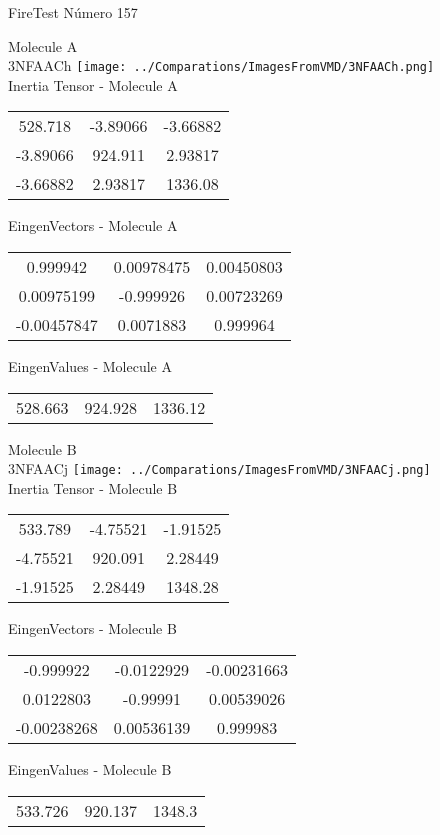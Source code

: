 \vtab[-2cm]
\begin{center}
{\large FireTest \tab Número 157}
\end{center}
\begin{multicols}{2}
\begin{center}

Molecule A \\ 
3NFAACh
\texttt{[image: ../Comparations/ImagesFromVMD/3NFAACh.png]}
\\
Inertia Tensor - Molecule A \\
\vtab

\begin{tabular}{|c c c|}
528.718	 & 	-3.89066	 & 	-3.66882	 \\
-3.89066	 & 	924.911	 & 	2.93817	 \\
-3.66882	 & 	2.93817	 & 	1336.08
\end{tabular}

\vtab
 EingenVectors - Molecule A     \\
\vtab
\begin{tabular}{|c c c|}
0.999942	 & 	0.00978475	 & 	0.00450803	 \\
0.00975199	 & 	-0.999926	 & 	0.00723269	 \\
-0.00457847	 & 	0.0071883	 & 	0.999964
\end{tabular}

\vtab
 EingenValues - Molecule A     \\
\vtab
\begin{tabular}{|c c c|}
528.663	 & 	924.928	 & 	1336.12	 \\
\end{tabular}
\columnbreak

Molecule B \\ 
3NFAACj
\texttt{[image: ../Comparations/ImagesFromVMD/3NFAACj.png]}
\\
Inertia Tensor - Molecule B \\
\vtab

\begin{tabular}{|c c c|}
533.789	 & 	-4.75521	 & 	-1.91525	 \\
-4.75521	 & 	920.091	 & 	2.28449	 \\
-1.91525	 & 	2.28449	 & 	1348.28
\end{tabular}

\vtab
 EingenVectors - Molecule B     \\
\vtab
\begin{tabular}{|c c c|}
-0.999922	 & 	-0.0122929	 & 	-0.00231663	 \\
0.0122803	 & 	-0.99991	 & 	0.00539026	 \\
-0.00238268	 & 	0.00536139	 & 	0.999983
\end{tabular}

\vtab
 EingenValues - Molecule B     \\
\vtab
\begin{tabular}{|c c c|}
533.726	 & 	920.137	 & 	1348.3	 \\
\end{tabular}

\end{center}
\end{multicols}
